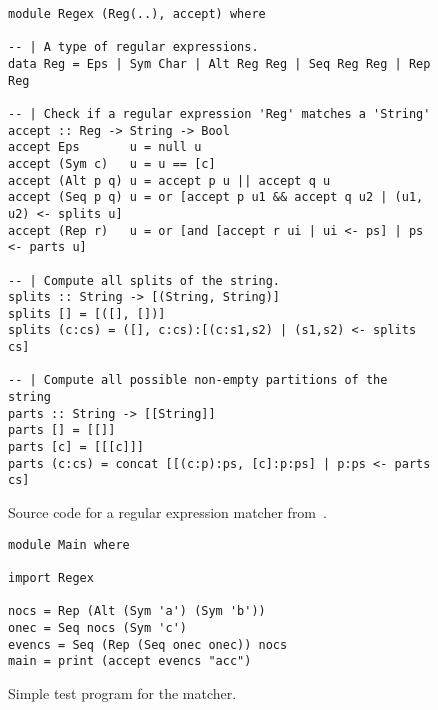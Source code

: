 \begin{figure}
\begin{lstlisting}
module Regex (Reg(..), accept) where

-- | A type of regular expressions.
data Reg = Eps | Sym Char | Alt Reg Reg | Seq Reg Reg | Rep Reg

-- | Check if a regular expression 'Reg' matches a 'String'
accept :: Reg -> String -> Bool
accept Eps       u = null u
accept (Sym c)   u = u == [c]
accept (Alt p q) u = accept p u || accept q u
accept (Seq p q) u = or [accept p u1 && accept q u2 | (u1, u2) <- splits u]
accept (Rep r)   u = or [and [accept r ui | ui <- ps] | ps <- parts u]

-- | Compute all splits of the string.
splits :: String -> [(String, String)]
splits [] = [([], [])]
splits (c:cs) = ([], c:cs):[(c:s1,s2) | (s1,s2) <- splits cs]

-- | Compute all possible non-empty partitions of the string
parts :: String -> [[String]]
parts [] = [[]]
parts [c] = [[[c]]]
parts (c:cs) = concat [[(c:p):ps, [c]:p:ps] | p:ps <- parts cs]
\end{lstlisting}
\caption{Source code for a regular expression matcher from~\cite{Fischer:2010:PRE:1863543.1863594}.}
\begin{lstlisting}
module Main where

import Regex

nocs = Rep (Alt (Sym 'a') (Sym 'b'))
onec = Seq nocs (Sym 'c')
evencs = Seq (Rep (Seq onec onec)) nocs
main = print (accept evencs "acc")
\end{lstlisting}
\caption{Simple test program for the matcher.}
\label{fig:matcher-haskell98}
\end{figure}



